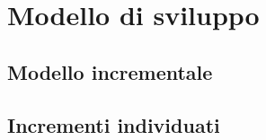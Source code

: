 

\section{Modello di sviluppo}
\subsection{Modello incrementale}
\subsection{Incrementi individuati}

